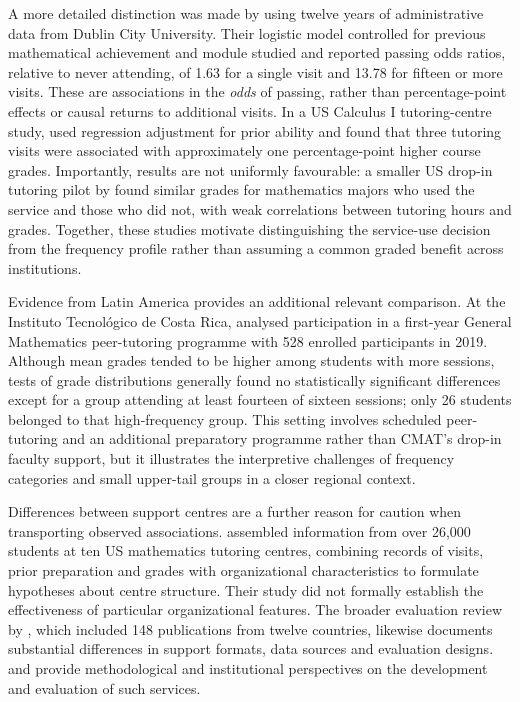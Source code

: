 \documentclass[namedate,webpdf,imaiai]{ima-authoring-template}
\begin{document}
A more detailed distinction was made by \citet{jacob2019} using twelve years of administrative data from Dublin City University. Their logistic model controlled for previous mathematical achievement and module studied and reported passing odds ratios, relative to never attending, of 1.63 for a single visit and 13.78 for fifteen or more visits. These are associations in the \emph{odds} of passing, rather than percentage-point effects or causal returns to additional visits. In a US Calculus I tutoring-centre study, \citet{rickard2018} used regression adjustment for prior ability and found that three tutoring visits were associated with approximately one percentage-point higher course grades. Importantly, results are not uniformly favourable: a smaller US drop-in tutoring pilot by \citet{navarramadsen2010} found similar grades for mathematics majors who used the service and those who did not, with weak correlations between tutoring hours and grades. Together, these studies motivate distinguishing the service-use decision from the frequency profile rather than assuming a common graded benefit across institutions.

Evidence from Latin America provides an additional relevant comparison. At the Instituto Tecnol\'ogico de Costa Rica, \citet{chaconvargas2022} analysed participation in a first-year General Mathematics peer-tutoring programme with 528 enrolled participants in 2019. Although mean grades tended to be higher among students with more sessions, tests of grade distributions generally found no statistically significant differences except for a group attending at least fourteen of sixteen sessions; only 26 students belonged to that high-frequency group. This setting involves scheduled peer-tutoring and an additional preparatory programme rather than CMAT's drop-in faculty support, but it illustrates the interpretive challenges of frequency categories and small upper-tail groups in a closer regional context.

Differences between support centres are a further reason for caution when transporting observed associations. \citet{byerley2024} assembled information from over 26,000 students at ten US mathematics tutoring centres, combining records of visits, prior preparation and grades with organizational characteristics to formulate hypotheses about centre structure. Their study did not formally establish the effectiveness of particular organizational features. The broader evaluation review by \citet{mullen2024}, which included 148 publications from twelve countries, likewise documents substantial differences in support formats, data sources and evaluation designs. \citet{matthews2013} and \citet{lawson2020} provide methodological and institutional perspectives on the development and evaluation of such services.
\end{document}
